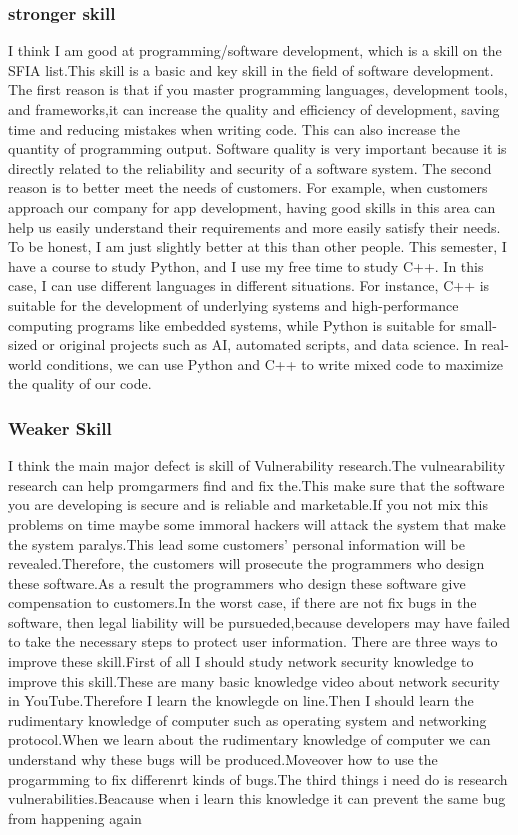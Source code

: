 \documentclass[a4paper, 11pt]{report}
\begin{document}
\subsubsection{stronger skill}
	I think I am good at programming/software development, which is a skill on the SFIA list.This skill is a basic and key skill in the field of software development.
The first reason is that if you master programming languages, development tools, and frameworks,it can increase the quality and efficiency of development, saving time and reducing mistakes when writing code. This can also increase the quantity of programming output. Software quality is very important because it is directly related to the reliability and security of a software system.
	The second reason is to better meet the needs of customers. For example, when customers approach our company for app development, having good skills in this area can help us easily understand their requirements and more easily satisfy their needs.
To be honest, I am just slightly better at this than other people. This semester, I have a course to study Python, and I use my free time to study C++. In this case, I can use different languages in different situations. For instance, C++ is suitable for the development of underlying systems and high-performance computing programs like embedded systems, while Python is suitable for small-sized or original projects such as AI, automated scripts, and data science. In real-world conditions, we can use Python and C++ to write mixed code to maximize the quality of our code.
\subsubsection{Weaker Skill}
I think the main major defect is skill of Vulnerability research.The vulnearability research can help promgarmers find and fix the.This make sure that the software you are developing is secure and is reliable and marketable.If you not mix this problems on time maybe some immoral hackers will attack the system that make the system paralys.This lead some customers' personal information will be revealed.Therefore, the customers will prosecute the programmers who design these software.As a result the programmers who design these software give compensation to customers.In the worst case, if there are not fix bugs in the software, then legal liability will be pursueded,because developers may have failed to take the necessary steps to protect user information.
	There are three ways to improve these skill.First of all I should study network security knowledge to improve this skill.These are many basic knowledge video about network security in 	YouTube.Therefore I learn the knowlegde on line.Then I should learn the rudimentary knowledge of computer such as operating system
and networking protocol.When we learn about the rudimentary knowledge of computer we can understand why these bugs will be produced.Moveover how to use the progarmming to fix differenrt kinds of bugs.The third things i need do is research vulnerabilities.Beacause when i learn this knowledge it can prevent the same bug from happening again
\end{document}
